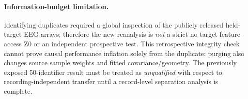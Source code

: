 \paragraph{Information-budget limitation.}
Identifying duplicates required a global inspection
of the publicly released held-target EEG arrays;
therefore the new reanalysis is \emph{not} a strict
no-target-feature-access Z0 or an independent
prospective test. This retrospective integrity check
cannot prove causal performance inflation solely
from the duplicate: purging also changes source
sample weights and fitted covariance/geometry.
The previously exposed 50-identifier result
must be treated as \emph{unqualified} with respect
to recording-independent transfer until a
record-level separation analysis is complete.

